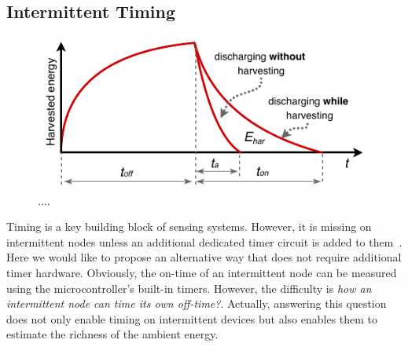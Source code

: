 \subsection{Intermittent Timing}
\label{subsec:interTimer}
%
\begin{figure}[t]
		\centering
		\includegraphics[width=\columnwidth]{figures/softwareClock}
		\caption{....}
		\label{fig:softwareClock}
\end{figure} 
%

Timing is a key building block of sensing systems. However, it is missing on intermittent nodes unless an additional dedicated timer circuit is added to them~\cite{hester2017timely}. Here we would like to propose an alternative way that does not require additional timer hardware. Obviously, the on-time of an intermittent node can be measured using the microcontroller's built-in timers. However, the difficulty is \textit{how an intermittent node can time its own off-time?}. Actually, answering this question does not only enable timing on intermittent devices but also enables them to estimate the richness of the ambient energy. 

